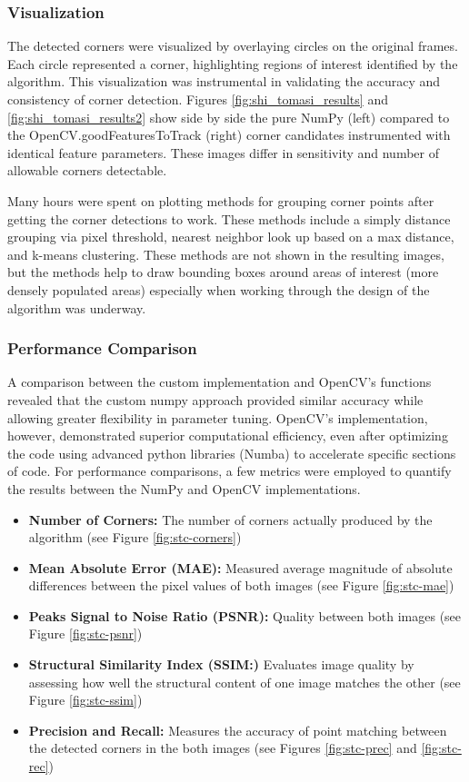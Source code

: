 \documentclass[11pt, conference, letterpaper]{IEEEtran}
\begin{document}
\subsubsection{Visualization}
The detected corners were visualized by overlaying circles on the original frames. Each circle represented a corner, highlighting regions of interest identified by the algorithm. This visualization was instrumental in validating the accuracy and consistency of corner detection. Figures \ref{fig:shi_tomasi_results} and \ref{fig:shi_tomasi_results2} show side by side the pure NumPy (left) compared to the OpenCV.goodFeaturesToTrack (right) corner candidates instrumented with identical feature parameters. These images differ in sensitivity and number of allowable corners detectable.

Many hours were spent on plotting methods for grouping corner points after getting the corner detections to work. These methods include a simply distance grouping via pixel threshold, nearest neighbor look up based on a max distance, and k-means clustering. These methods are not shown in the resulting images, but the methods help to draw bounding boxes around areas of interest (more densely populated areas) especially when working through the design of the algorithm was underway.
\bigskip

\subsubsection{Performance Comparison}
A comparison between the custom implementation and OpenCV's functions revealed that the custom numpy approach provided similar accuracy while allowing greater flexibility in parameter tuning. OpenCV's implementation, however, demonstrated superior computational efficiency, even after optimizing the code using advanced python libraries (Numba) to accelerate specific sections of code. For performance comparisons, a few metrics were employed to quantify the results between the NumPy and OpenCV implementations.

\begin{itemize}
    \item \textbf{Number of Corners:} The number of corners actually produced by the algorithm (see Figure \ref{fig:stc-corners})
    \item \textbf{Mean Absolute Error (MAE):} Measured average magnitude of absolute differences between the pixel values of both images (see Figure \ref{fig:stc-mae})
    \item \textbf{Peaks Signal to Noise Ratio (PSNR):} Quality between both images (see Figure \ref{fig:stc-psnr})
    \item \textbf{Structural Similarity Index (SSIM:)} Evaluates image quality by assessing how well the structural content of one image matches the other (see Figure \ref{fig:stc-ssim})
    \item \textbf{Precision and Recall:} Measures the accuracy of point matching between the detected corners in the both images (see Figures \ref{fig:stc-prec} and \ref{fig:stc-rec})
\end{itemize}
\end{document}
